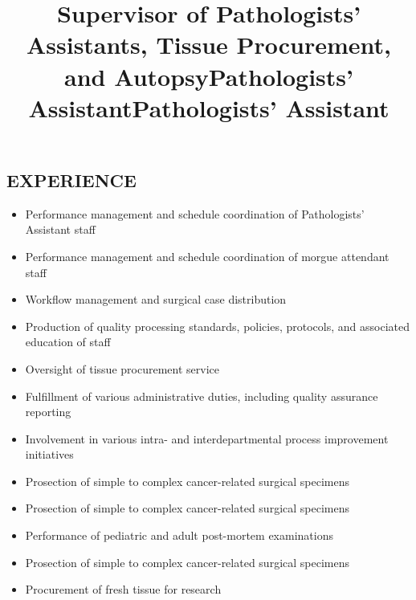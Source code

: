 \documentclass[margin]{res}
\begin{document}
\begin{resume}
\section{EXPERIENCE}
\title{\textbf{Supervisor of Pathologists’ Assistants, Tissue Procurement, and Autopsy}}
\begin{position}\begin{itemize}
\item Performance management and schedule coordination of Pathologists’ Assistant staff
\item Performance management and schedule coordination of morgue attendant staff
\item Workflow management and surgical case distribution 
\item Production of quality processing standards, policies, protocols, and associated education of staff 
\item Oversight of tissue procurement service
\item Fulfillment of various administrative duties, including quality assurance reporting
\item Involvement in various intra- and interdepartmental process improvement initiatives
\item Prosection of simple to complex cancer-related surgical specimens
\end{itemize}
\end{position}

\title{\textbf{Pathologists’ Assistant}}
\begin{position}
\begin{itemize}
\item Prosection of simple to complex cancer-related surgical specimens
\item Performance of pediatric and adult post-mortem examinations
\end{itemize}
\end{position}

\title{\textbf{Pathologists’ Assistant}}
\begin{position}
\begin{itemize}
\item Prosection of simple to complex cancer-related surgical specimens
\item Procurement of fresh tissue for research
\end{itemize}
\end{position}


\end{resume}
\end{document}
